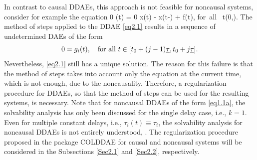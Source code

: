 \documentclass[final,reqno]{siamltex}
\begin{document}
In contrast to causal DDAEs, this approach is not feasible for noncausal systems,
consider for example the equation 
%
\be\label{eq2.1}
  0 \cdot {}(t) = 0 \cdot x(t) - x(t-\tau) + f(t), \quad \mbox{for all } t\in (0,\infty).
\ee
%
The method of steps applied to the DDAE \eqref{eq2.1} results in a sequence of undetermined DAEs of the form
%
\[
 0 = g_i(t), \quad \mbox{for all } t \in [t_0+(j-1)\underline{\tau},t_0+j\underline{\tau}]. 
\]
%
Nevertheless, \eqref{eq2.1} still has a unique solution. 
The reason for this failure is that the method of steps takes into account only the equation at the current time, which is not enough, 
due to the noncausality. Therefore, a regularization procedure for DDAEs, so that the method of steps can be used for the resulting systems, is 
necessary. Note that for noncausal DDAEs of the form \eqref{eq1.1a}, the solvability analysis has only been discussed for 
the single delay case, i.e., $k=1$. Even for multiple constant delays, i.e., $\tau_i(t) \equiv \tau_i$, the solvability analysis for noncausal DDAEs 
is not entirely understood, \cite{HaM14,Ha15}. 
The regularization procedure proposed in the package COLDDAE for causal and noncausal systems will be considered in the Subsections \ref{Sec2.1} and \ref{Sec2.2}, respectively.
\end{document}
